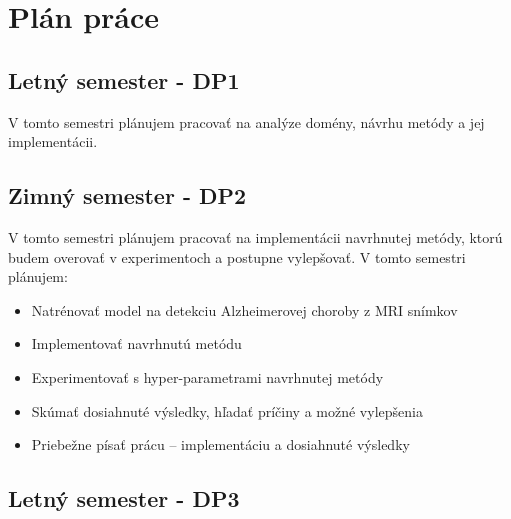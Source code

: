 \chapter{Plán práce \label{cha:plan}}

\setcounter{page}{1}

\section{Letný semester - DP1}

V tomto semestri plánujem pracovať na analýze domény, návrhu metódy a jej implementácii.

\section{Zimný semester - DP2}

    
    V tomto semestri plánujem pracovať na implementácii navrhnutej metódy, ktorú budem overovať v experimentoch a postupne vylepšovať. V tomto semestri plánujem:
    
    \begin{itemize}
        \item Natrénovať model na detekciu Alzheimerovej choroby z MRI snímkov
        \item Implementovať navrhnutú metódu
        \item Experimentovať s hyper-parametrami navrhnutej metódy
        \item Skúmať dosiahnuté výsledky, hľadať príčiny a možné vylepšenia
        \item Priebežne písať prácu -- implementáciu a dosiahnuté výsledky
    \end{itemize}



\section{Letný semester - DP3}

    
